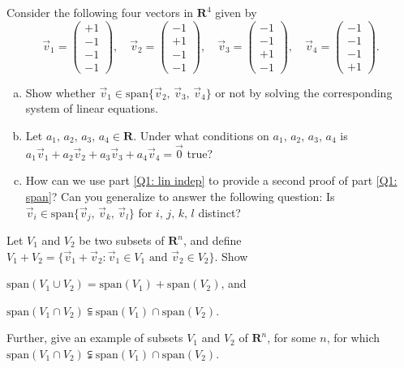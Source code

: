 \documentclass[a4paper,11pt]{article}
\newcommand{\R}{\mathbf{R}}
\begin{document}
 Consider the following four vectors in $\R^4$
given by
\[
  \vec v_1 = \begin{pmatrix}+1 \\ -1 \\ -1 \\ -1\end{pmatrix},  \quad
  \vec v_2 = \begin{pmatrix}-1 \\ +1 \\ -1 \\ -1\end{pmatrix}, \quad
  \vec v_3 = \begin{pmatrix}-1 \\ -1 \\ +1 \\ -1\end{pmatrix}, \quad
  \vec v_4 = \begin{pmatrix}-1 \\ -1 \\ -1 \\ +1\end{pmatrix}.
\]
\begin{enumerate}[(a)]
\item\label{Q1: span} Show whether $\vec v_1 \in \text{span}\{\vec v_2,\,\vec
  v_3,\,\vec v_4\}$ 
  or not by solving the corresponding system of linear equations.
\item\label{Q1: lin indep} Let $a_1,\,a_2,\,a_3,\,a_4 \in \R$. Under what
  conditions on $a_1,\,a_2,\,a_3,\,a_4$ is $a_1\vec v_1+a_2\vec v_2+a_3\vec
  v_3+a_4\vec v_4=\vec{0}$ true?
\item How can we use part \ref{Q1: lin indep} to provide a second proof of part
  \ref{Q1: span}? Can you generalize to answer the following question: Is $\vec
  v_i \in \text{span}\{\vec v_j,\,\vec v_k,\,\vec v_l\}$ for $i,\,j,\,k,\,l$
  distinct? \\
\end{enumerate}

 Let $V_1$ and $V_2$ be two subsets of $\R^n$, and
define $V_1+V_2=\{\vec v_1 + \vec v_2 : \vec v_1 \in V_1 \text{ and } \vec v_2
\in V_2 \}$. Show
\begin{enumerate*}[(a)]
\item $\text{span}(V_1 \cup V_2) = \text{span}(V_1) + \text{span}(V_2)$, and
\item $\text{span}(V_1 \cap V_2) \subseteqq \text{span}(V_1) \cap
  \text{span}(V_2)$.
\end{enumerate*}
Further, give an example of subsets $V_1$ and $V_2$ of $\R^n$, for some $n$, for
which $\text{span}(V_1 \cap V_2) \subsetneqq \text{span}(V_1) \cap
\text{span}(V_2)$. \\
\end{document}
